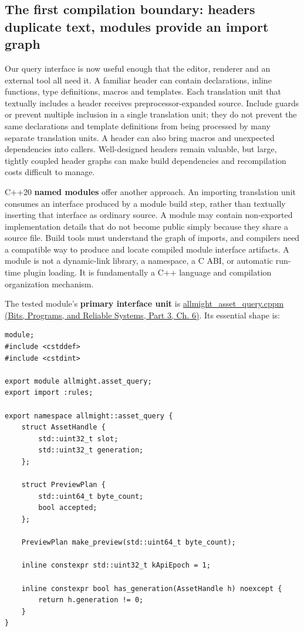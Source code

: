 \subsection{The first compilation boundary: headers duplicate text, modules provide an import graph}\label{05-engine-i-ch006-the-first-compilation-boundary-headers-duplicate-text-modules-provide-an-import-graph}

\hypertarget{05-engine-i-ch006-the-first-compilation-boundary-headers-duplicate-text-modules-provide-an-import-graph}{}

Our query interface is now useful enough that the editor, renderer and an external tool all need it. A familiar header can contain declarations, inline functions, type definitions, macros and templates. Each translation unit that textually includes a header receives preprocessor-expanded source. Include guards or  prevent multiple inclusion in a single translation unit; they do not prevent the same declarations and template definitions from being processed by many separate translation units. A header can also bring macros and unexpected dependencies into callers. Well-designed headers remain valuable, but large, tightly coupled header graphs can make build dependencies and recompilation costs difficult to manage.

C++20 \textbf{named modules} offer another approach. An importing translation unit consumes an interface produced by a module build step, rather than textually inserting that interface as ordinary source. A module may contain non-exported implementation details that do not become public simply because they share a source file. Build tools must understand the graph of imports, and compilers need a compatible way to produce and locate compiled module interface artifacts. A module is not a dynamic-link library, a namespace, a C ABI, or automatic run-time plugin loading. It is fundamentally a C++ language and compilation organization mechanism.

The tested module's \textbf{primary interface unit} is \href{../01-Bits-Programs-and-Reliable-Systems-P03/main.pdf\#nameddest=source-file-453ba365bb56ed2f6e4c3f8e}{allmight\_asset\_query.cppm (Bits, Programs, and Reliable Systems, Part 3, Ch. 6)}. Its essential shape is:

\begin{verbatim}
module;
#include <cstddef>
#include <cstdint>

export module allmight.asset_query;
export import :rules;

export namespace allmight::asset_query {
    struct AssetHandle {
        std::uint32_t slot;
        std::uint32_t generation;
    };

    struct PreviewPlan {
        std::uint64_t byte_count;
        bool accepted;
    };

    PreviewPlan make_preview(std::uint64_t byte_count);

    inline constexpr std::uint32_t kApiEpoch = 1;

    inline constexpr bool has_generation(AssetHandle h) noexcept {
        return h.generation != 0;
    }
}
\end{verbatim}

